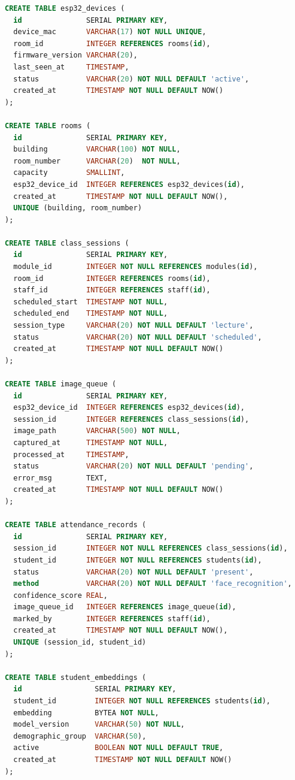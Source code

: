 \documentclass[12pt,a4paper]{report}
\begin{document}
\begin{lstlisting}[language=SQL, caption={Complete database schema (PostgreSQL)}]
CREATE TABLE esp32_devices (
  id               SERIAL PRIMARY KEY,
  device_mac       VARCHAR(17) NOT NULL UNIQUE,
  room_id          INTEGER REFERENCES rooms(id),
  firmware_version VARCHAR(20),
  last_seen_at     TIMESTAMP,
  status           VARCHAR(20) NOT NULL DEFAULT 'active',
  created_at       TIMESTAMP NOT NULL DEFAULT NOW()
);

CREATE TABLE rooms (
  id               SERIAL PRIMARY KEY,
  building         VARCHAR(100) NOT NULL,
  room_number      VARCHAR(20)  NOT NULL,
  capacity         SMALLINT,
  esp32_device_id  INTEGER REFERENCES esp32_devices(id),
  created_at       TIMESTAMP NOT NULL DEFAULT NOW(),
  UNIQUE (building, room_number)
);

CREATE TABLE class_sessions (
  id               SERIAL PRIMARY KEY,
  module_id        INTEGER NOT NULL REFERENCES modules(id),
  room_id          INTEGER REFERENCES rooms(id),
  staff_id         INTEGER REFERENCES staff(id),
  scheduled_start  TIMESTAMP NOT NULL,
  scheduled_end    TIMESTAMP NOT NULL,
  session_type     VARCHAR(20) NOT NULL DEFAULT 'lecture',
  status           VARCHAR(20) NOT NULL DEFAULT 'scheduled',
  created_at       TIMESTAMP NOT NULL DEFAULT NOW()
);

CREATE TABLE image_queue (
  id               SERIAL PRIMARY KEY,
  esp32_device_id  INTEGER REFERENCES esp32_devices(id),
  session_id       INTEGER REFERENCES class_sessions(id),
  image_path       VARCHAR(500) NOT NULL,
  captured_at      TIMESTAMP NOT NULL,
  processed_at     TIMESTAMP,
  status           VARCHAR(20) NOT NULL DEFAULT 'pending',
  error_msg        TEXT,
  created_at       TIMESTAMP NOT NULL DEFAULT NOW()
);

CREATE TABLE attendance_records (
  id               SERIAL PRIMARY KEY,
  session_id       INTEGER NOT NULL REFERENCES class_sessions(id),
  student_id       INTEGER NOT NULL REFERENCES students(id),
  status           VARCHAR(20) NOT NULL DEFAULT 'present',
  method           VARCHAR(20) NOT NULL DEFAULT 'face_recognition',
  confidence_score REAL,
  image_queue_id   INTEGER REFERENCES image_queue(id),
  marked_by        INTEGER REFERENCES staff(id),
  created_at       TIMESTAMP NOT NULL DEFAULT NOW(),
  UNIQUE (session_id, student_id)
);

CREATE TABLE student_embeddings (
  id                 SERIAL PRIMARY KEY,
  student_id         INTEGER NOT NULL REFERENCES students(id),
  embedding          BYTEA NOT NULL,
  model_version      VARCHAR(50) NOT NULL,
  demographic_group  VARCHAR(50),
  active             BOOLEAN NOT NULL DEFAULT TRUE,
  created_at         TIMESTAMP NOT NULL DEFAULT NOW()
);


\end{lstlisting}
\end{document}
